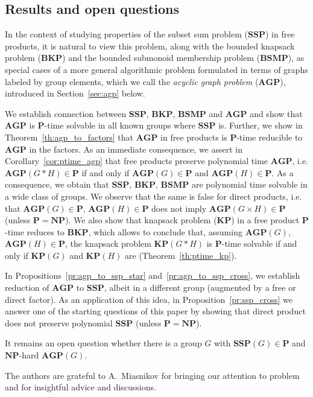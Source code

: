 \documentclass[10pt]{amsart}
\theoremstyle{definition}
\def\P{{\mathbf{P}}}
\def\NP{{\mathbf{NP}}}
\def\SSP{{\mathbf{SSP}}}
\def\BSMP{{\mathbf{BSMP}}}
\def\BKP{{\mathbf{BKP}}}
\def\KP{{\mathbf{KP}}}
\def\AGP{{\mathbf{AGP}}}
\begin{document}
\subsection{Results and open questions}\label{sub:results}
In the context of studying properties of the subset sum problem ($\SSP$) in free products, it is natural to view this problem, along with the bounded knapsack problem ($\BKP$) and the bounded submonoid membership problem ($\BSMP$), %
as special cases of a more general algorithmic problem formulated in terms of graphs labeled by group elements, which we call the {\em acyclic graph problem} ($\AGP$), introduced in Section~\ref{sec:agp} below.

We establish connection between $\SSP$, $\BKP$, $\BSMP$ and $\AGP$ and show that $\AGP$ is $\P$-time solvable in all known groups where $\SSP$ is. Further, we show in Theorem~\ref{th:agp_to_factors} that $\AGP$ in free products is $\P$-time reducible to $\AGP$ in the factors. As an immediate consequence, we assert in Corollary~\ref{cor:ptime_agp} that free products preserve polynomial time $\AGP$, i.e. $\AGP(G* H)\in\P$ if and only if $\AGP(G)\in\P$ and $\AGP(H)\in\P$. As a consequence, we obtain that $\SSP$, $\BKP$, $\BSMP$ are polynomial time solvable in a wide class of groups. We observe that the same is false for direct products, i.e. that $\AGP(G)\in\P$, $\AGP(H)\in\P$ does not imply $\AGP(G\times H)\in\P$ (unless $\P=\NP$). We also show that knapsack problem ($\KP$) in a free product $\P$-time reduces to $\BKP$, which allows to conclude that, assuming $\AGP(G)$, $\AGP(H)\in\P$, the knapsack problem $\KP(G*H)$ is $\P$-time solvable if and only if $\KP(G)$ and $\KP(H)$ are (Theorem~\ref{th:ptime_kp}).

In Propositions~\ref{pr:agp_to_ssp_star} and~\ref{pr:agp_to_ssp_cross}, we establish reduction of $\AGP$ to $\SSP$, albeit in a different group (augmented by a free or direct factor). As an application of this idea, in Proposition~\ref{pr:ssp_cross} we answer one of the starting questions of this paper by showing that direct product does not preserve polynomial $\SSP$ (unless $\P=\NP$). %

It remains an open question whether there is a group $G$ with $\SSP(G)\in\P$ and $\NP$-hard $\AGP(G)$.

The authors are grateful to A.~Miasnikov for bringing our attention to problem and for insightful advice and discussions.
\end{document}
